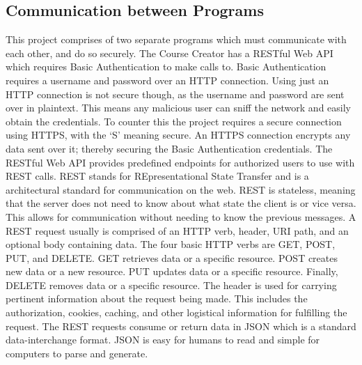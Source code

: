 \subsection{Communication between Programs}
This project comprises of two separate programs which must communicate with each other, and do so securely. The Course Creator has a RESTful Web API which requires Basic Authentication to make calls to.  Basic Authentication requires a username and password over an HTTP connection. Using just an HTTP connection is not secure though, as the username and password are sent over in plaintext. This means any malicious user can sniff the network and easily obtain the credentials. To counter this the project requires a secure connection using HTTPS, with the `S' meaning secure. An HTTPS connection encrypts any data sent over it; thereby securing the Basic Authentication credentials. The RESTful Web API provides predefined endpoints for authorized users to use with REST calls. REST stands for REpresentational State Transfer and is a architectural standard for communication on the web. REST is stateless, meaning that the server does not need to know about what state the client is or vice versa. This allows for communication without needing to know the previous messages. A REST request usually is comprised of an HTTP verb, header, URI path, and an optional body containing data. The four basic HTTP verbs are GET, POST, PUT, and DELETE. GET retrieves data or a specific resource. POST creates new data or a new resource. PUT updates data or a specific resource. Finally, DELETE removes data or a specific resource. The header is used for carrying pertinent information about the request being made. This includes the authorization, cookies, caching, and other logistical information for fulfilling the request. The REST requests consume or return data in JSON which is a standard data-interchange format. JSON is easy for humans to read and simple for computers to parse and generate.


